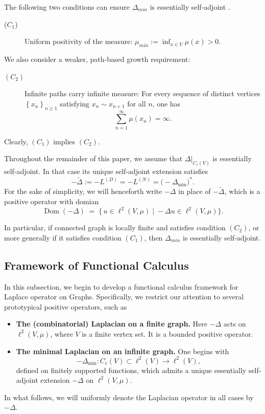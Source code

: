 \documentclass[reqno,12pt]{amsart}
\numberwithin{equation}{section}
\begin{document}
The following two conditions can ensure $\Delta_{min}$ is essentially self‐adjoint \cite[Theorem~6]{keller2012dirichlet}.

\begin{description}
	\item[($C_1$)] Uniform positivity of the measure: $\mu_{min}:=\inf_{x\in V}\mu(x)>0.$
\end{description}
We also consider a weaker, path‐based growth requirement:

\begin{description}
	\item[$\left(C_2\right)$] Infinite paths carry infinite measure:
	For every sequence of distinct vertices $\left\{x_n\right\}_{n\ge1}$ satisfying $x_n\sim x_{n+1}$ for all $n$, one has
	\[
	\sum_{n=1}^\infty \mu(x_n) =\infty.
	\]
\end{description}
Clearly, $(C_1)$ implies $\left(C_2\right).$ 


Throughout the remainder of this paper, we assume that $\Delta\big|_{C_c\left(V\right)}$ is essentially self‐adjoint.  In that case its unique self‐adjoint extension satisfies
\[
-\tilde{\Delta}:=-L^{(D)}=-L^{(N)}=\bigl(-\Delta_{\min}\bigr)^*.
\]
For the sake of simplicity, we will henceforth write \(-\Delta\) in place of \(-\tilde{\Delta}\), which is a positive operator with domian
\[
\operatorname{Dom}(-\Delta)
\;=\;\bigl\{\,u\in\ell^2(V,\mu)\;\big|\;-\Delta u\in \ell^2(V,\mu)\bigr\}.
\]

In particular, if connected graph is locally finite and satisfies condition \((C_2)\), or more generally if it satisfies condition \((C_1)\), then $\Delta_{min}$ is essentially self‐adjoint.


\subsection{Framework of Functional Calculus}\label{sec:spectral}

In this subsection, we begin to develop a functional calculus framework for Laplace operator on Graphs. Specifically, we restrict our attention to several prototypical positive operators, such as
\begin{itemize}
	\item \textbf{The (combinatorial) Laplacian on a finite graph.}  
	Here $-\Delta$ acts on $\ell^2(V,\mu)$, where $V$ is a finite vertex set.  It is a bounded positive operator.
	\item \textbf{The minimal Laplacian on an infinite graph.}  
	One begins with 
	\[
	-\Delta_{\min}\colon C_c(V)\subset \ell^2(V)\to\ell^2(V),
	\]
	defined on finitely supported functions, which admits a unique essentially self‐adjoint extension $-\Delta$ on $\ell^2(V,\mu)$.
\end{itemize}
 In what follows, we will uniformly denote the Laplacian operator in all cases by $-\Delta$.
\end{document}
